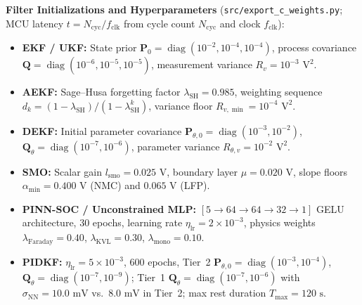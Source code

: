 \documentclass[10pt,a4paper]{article}
\begin{document}
\noindent\textbf{Filter Initializations and Hyperparameters} (\texttt{src/\allowbreak export\_c\_weights.py}; MCU latency $t = N_{\text{cyc}}/f_{\text{clk}}$ from cycle count $N_{\text{cyc}}$ and clock $f_{\text{clk}}$):
\begin{itemize}[itemsep=1pt,topsep=2pt]
\item \textbf{EKF / UKF:} State prior $\mathbf{P}_0 = \operatorname{diag}(10^{-2}, 10^{-4}, 10^{-4})$, process covariance $\mathbf{Q} = \operatorname{diag}(10^{-6}, 10^{-5}, 10^{-5})$, measurement variance $R_v = 10^{-3}\text{ V}^2$.
\item \textbf{AEKF:} Sage--Husa forgetting factor $\lambda_{\text{SH}} = 0.985$, weighting sequence $d_k = (1 - \lambda_{\text{SH}})/(1 - \lambda_{\text{SH}}^k)$, variance floor $R_{v,\min} = 10^{-4}\text{ V}^2$.
\item \textbf{DEKF:} Initial parameter covariance $\mathbf{P}_{\theta,0} = \operatorname{diag}(10^{-3}, 10^{-2})$, $\mathbf{Q}_\theta = \operatorname{diag}(10^{-7}, 10^{-6})$, parameter variance $R_{\theta,v} = 10^{-2}\text{ V}^2$.
\item \textbf{SMO:} Scalar gain $l_{\text{smo}} = 0.025\text{ V}$, boundary layer $\mu = 0.020\text{ V}$, slope floors $\alpha_{\min} = 0.400\text{ V}$ (NMC) and $0.065\text{ V}$ (LFP).
\item \textbf{PINN-SOC / Unconstrained MLP:} $[5 \rightarrow 64 \rightarrow 64 \rightarrow 32 \rightarrow 1]$ GELU architecture, $30$ epochs, learning rate $\eta_{\text{lr}} = 2\times 10^{-3}$, physics weights $\lambda_{\text{Faraday}} = 0.40$, $\lambda_{\text{KVL}} = 0.30$, $\lambda_{\text{mono}} = 0.10$.
\item \textbf{PIDKF:} $\eta_{\text{lr}} = 5\times 10^{-3}$, $600$ epochs, Tier~2 $\mathbf{P}_{\theta,0} = \operatorname{diag}(10^{-3}, 10^{-4})$, $\mathbf{Q}_\theta = \operatorname{diag}(10^{-7}, 10^{-9})$; Tier~1 $\mathbf{Q}_\theta = \operatorname{diag}(10^{-7}, 10^{-6})$ with $\sigma_{\text{NN}} = 10.0\text{ mV}$ vs.\ $8.0\text{ mV}$ in Tier~2; max rest duration $T_{\max} = 120\text{ s}$.
\end{itemize}
\end{document}
